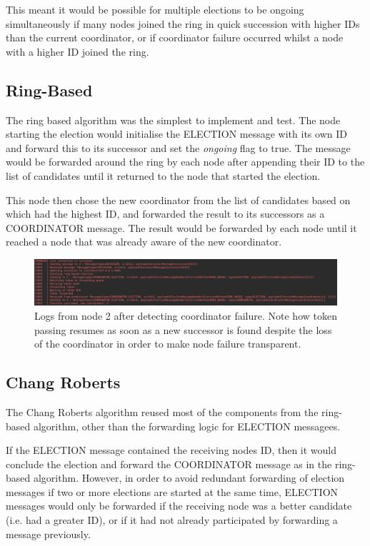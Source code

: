 \documentclass[12pt]{article}
\begin{document}
This meant it would be possible for multiple elections to be ongoing simultaneously if many nodes joined the ring in quick succession with higher IDs than the current coordinator, or if coordinator failure occurred whilst a node with a higher ID joined the ring. 

\subsection{Ring-Based}

The ring based algorithm was the simplest to implement and test. The node starting the election would initialise the ELECTION message with its own ID and forward this to its successor and set the \emph{ongoing} flag to true. The message would be forwarded around the ring by each node after appending their ID to the list of candidates until it returned to the node that started the election. 

This node then chose the new coordinator from the list of candidates based on which had the highest ID, and forwarded the result to its successors as a COORDINATOR message. The result would be forwarded by each node until it reached a node that was already aware of the new coordinator.

\begin{figure}[!ht]
	\centering
	\includegraphics[width=\linewidth]{images/ringelec}
	\caption{Logs from node 2 after detecting coordinator failure. Note how token passing resumes as soon as a new successor is found despite the loss of the coordinator in order to make node failure transparent.}
	\label{fig:ringbased}
\end{figure}

\subsection{Chang Roberts}

The Chang Roberts algorithm reused most of the components from the ring-based algorithm, other than the forwarding logic for ELECTION messagees.

If the ELECTION message contained the receiving nodes ID, then it would conclude the election and forward the COORDINATOR message as in the ring-based algorithm. However, in order to avoid redundant forwarding of election messages if two or more elections are started at the same time, ELECTION messages would only be forwarded if the receiving node was a better candidate (i.e. had a greater ID), or if it had not already participated by forwarding a message previously.
\end{document}
